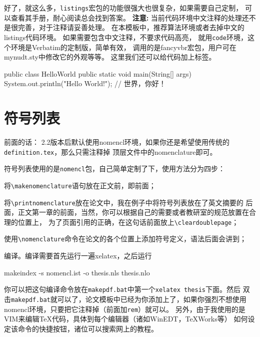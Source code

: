 {好了，就这么多，\texttt{listings}宏包的功能很强大也很复杂，如果需要自己定制，
可以查看其手册，耐心阅读总会找到答案。
\textbf{注意:} 当前代码环境中文注释的处理还不是很完善，对于注释请妥善处理。
在本模板中，推荐算法环境或者去掉中文的listings代码环境。
如果需要包含中文注释，不要求代码高亮，
就用\texttt{code}环境，这个环境是Verbatim的定制版，简单有效，
调用的是fancyvbr宏包，用户可在mynudt.sty中修改它的外观等等。
这里我们还可以给代码加上标签。
\begin{code}[label=hello.c]
public class HelloWorld {
   public static void main(String[] args) {
      System.out.println("Hello World!");
   }
}   // 世界，你好！
\end{code}

\section{符号列表}

{\hei 前面的话：}{\kai\color{blue} 
2.2版本后默认使用nomencl环境，如果你还是希望使用传统的\verb|definition.tex|，那么只需注释掉
顶层文件中的nomenclature即可。}

符号列表使用的是\verb|nomencl|包，自己简单定制了下，使用方法分为四步：
\begin{compactenum}
\item 将\verb|\makenomenclature|语句放在正文前，即\verb||前面；
\item 将\verb|\printnomenclature|放在论文中，我在例子中将符号列表放在了英文摘要的
后面，正文第一章的前面，当然，你可以根据自己的需要或者教研室的规范放置在合理的位置上，
为了页面引用的正确，在这句话前面放上\verb|\cleardoublepage|；
\item 使用\verb|\nomenclature|命令在论文的各个位置上添加符号定义，语法后面会讲到；
\item 编译。编译需要首先运行一遍xelatex，之后运行
\begin{code}
makeindex -s nomencl.ist -o thesis.nls thesis.nlo
\end{code}
\end{compactenum}

你可以把这句编译命令放在\verb|makepdf.bat|中第一个\verb|xelatex thesis|下面。然后
双击\verb|makepdf.bat|就可以了，论文模板中已经为你添加上了，如果你强烈不想使用
nomencl环境，只要把它注释掉（前面加\verb|rem|）就可以。
另外，由于我使用的是VIM来编辑\TeX{}代码，具体到每个编辑器（诸如WinEDT，TeXWorks等）
如何设定该命令的快捷按钮，诸位可以搜索网上的教程。

}

